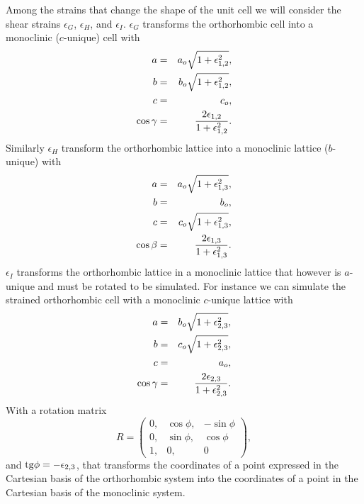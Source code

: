 \documentclass[12pt,a4paper]{article}
\begin{document}
Among the strains that change the shape of the unit cell we will consider
the shear strains $\epsilon_G$, $\epsilon_H$, and $\epsilon_I$.
$\epsilon_G$ transforms the orthorhombic cell into a 
monoclinic ($c$-unique) cell with
\begin{eqnarray}
a&=&a_o \sqrt{1+\epsilon_{1,2}^2}, \\
b&=&b_o \sqrt{1+\epsilon_{1,2}^2}, \\
c&=&c_o, \\
\cos\gamma &=& {2 \epsilon_{1,2} \over 1 + \epsilon_{1,2}^2}.
\end{eqnarray}
Similarly $\epsilon_H$ transform the orthorhombic lattice into a 
monoclinic lattice ($b$-unique) with 
\begin{eqnarray}
a&=&a_o \sqrt{1+\epsilon_{1,3}^2}, \\
b&=&b_o, \\
c&=&c_o \sqrt{1+\epsilon_{1,3}^2}, \\
\cos\beta &=& {2 \epsilon_{1,3} \over 1 + \epsilon_{1,3}^2}. 
\end{eqnarray}
$\epsilon_I$ transforms the orthorhombic lattice in a monoclinic lattice that 
however is $a$-unique and must be rotated to be simulated.
For instance we can simulate the strained orthorhombic cell with a monoclinic
$c$-unique lattice with
\begin{eqnarray}
a&=&b_o \sqrt{1+\epsilon_{2,3}^2}, \\
b&=&c_o \sqrt{1+\epsilon_{2,3}^2}, \\
c&=&a_o, \\
\cos\gamma &=& {2 \epsilon_{2,3} \over 1 + \epsilon_{2,3}^2}. 
\end{eqnarray}
With a rotation matrix
\begin{equation}
R=\left( \begin{array}{ccc}
0, & \cos \phi, &  -\sin \phi
\\
0, & \sin \phi, & \cos \phi 
\\
1, & 0, & 0
\end{array}
\right),
\end{equation}
and ${\rm tg} \phi =-\epsilon_{2,3}$, that transforms the coordinates
of a point expressed in the Cartesian basis of the orthorhombic system
into the coordinates of a point in the Cartesian basis of the monoclinic
system.
\end{document}
